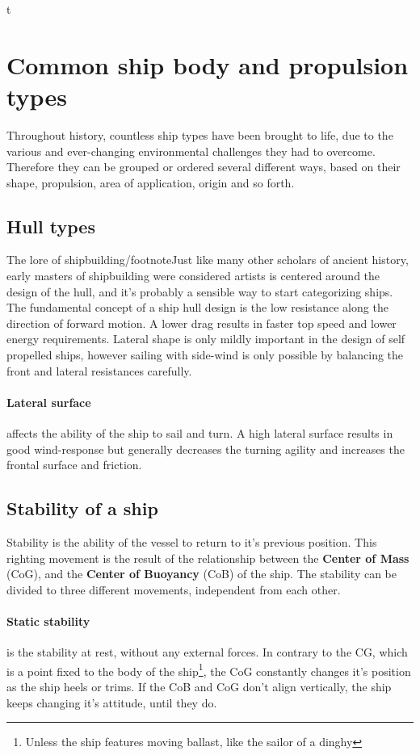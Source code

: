 t

\section{Common ship body and propulsion types}

Throughout history, countless ship types have been brought to life, due to the various and ever-changing environmental challenges they had to overcome. Therefore they can be grouped or ordered several different ways, based on their shape, propulsion, area of application, origin and so forth.

\subsection{Hull types}

The lore of shipbuilding/footnote{Just like many other scholars of ancient history, early masters of shipbuilding were considered artists \cite{Art_of_shipbuilding}} is centered around the design of the hull, and it's probably a sensible way to start categorizing ships.
The fundamental concept of a ship hull design is the low resistance along the direction of forward motion. A lower drag results in faster top speed and lower energy requirements. Lateral shape is only mildly important in the design of self propelled ships, however sailing with side-wind is only possible by balancing the front and lateral resistances carefully\cite{vitorlazas}.

\paragraph{Lateral surface} affects the ability of the ship to sail and turn. A high lateral surface results in good wind-response but generally decreases the turning agility and increases the frontal surface and friction.

\subsection{Stability of a ship} 

Stability is the ability of the vessel to return to it's previous position\cite{stability}. This righting movement is the result of the relationship between the \textbf{Center of Mass} (CoG), and the \textbf{Center of Buoyancy} (CoB) of the ship. The stability can be divided to three different movements, independent from each other.

\paragraph{Static stability} is the stability at rest, without any external forces. In contrary to the CG, which is a point fixed to the body of the ship\footnote{Unless the ship features moving ballast, like the sailor of a dinghy}, the CoG constantly changes it's position as the ship heels or trims. If the CoB and CoG don't align vertically, the ship keeps changing it's attitude, until they do.

